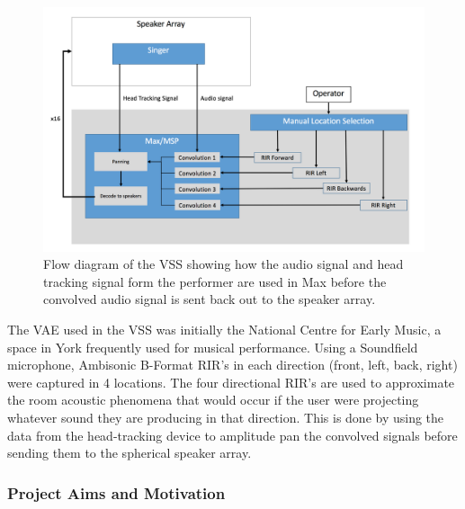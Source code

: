 \documentclass[../../main.tex]{subfiles}
\begin{document}
	
		\begin{figure}[H]
			\centerline{\includegraphics[scale = 0.45]{Sections/Background/images/vssDiagram.png}}
			\caption{Flow diagram of the VSS showing how the audio signal and head tracking signal form the performer are used in Max before the convolved audio signal is sent back out to the speaker array.}
			\label{vssDiagram}
		\end{figure}

		The \ac{VAE} used in the \ac{VSS} was initially the National Centre for Early Music, a space in York frequently used for musical performance. Using a Soundfield microphone, Ambisonic B-Format \ac{RIR}'s in each direction (front, left, back, right) were captured in 4 locations. The four directional \ac{RIR}'s are used to approximate the room acoustic phenomena that would occur if the user were projecting whatever sound they are producing in that direction. This is done by using the data from the head-tracking device to amplitude pan the convolved signals before sending them to the spherical speaker array.


	\subsubsection{Project Aims and Motivation}
	\label{background:aims}
		
\end{document}
